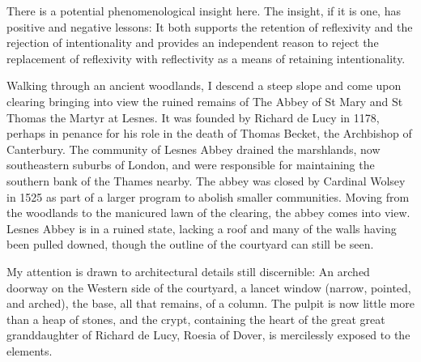 There is a potential phenomenological insight here. The insight, if it is one, has positive and negative lessons: It both supports the retention of reflexivity and the rejection of intentionality and provides an independent reason to reject the replacement of reflexivity with reflectivity as a means of retaining intentionality. 

Walking through an ancient woodlands, I descend a steep slope and come upon clearing bringing into view the ruined remains of The Abbey of St Mary and St Thomas the Martyr at Lesnes. It was founded by Richard de Lucy in 1178, perhaps in penance for his role in the death of Thomas Becket, the Archbishop of Canterbury. The community of Lesnes Abbey drained the marshlands, now southeastern suburbs of London, and were responsible for maintaining the southern bank of the Thames nearby. The abbey was closed by Cardinal Wolsey in 1525 as part of a larger program to abolish smaller communities. Moving from the woodlands to the manicured lawn of the clearing, the abbey comes into view. Lesnes Abbey is in a ruined state, lacking a roof and many of the walls having been pulled downed, though the outline of the courtyard can still be seen.

My attention is drawn to architectural details still discernible: An arched doorway on the Western side of the courtyard, a lancet window (narrow, pointed, and arched), the base, all that remains, of a column. The pulpit is now little more than a heap of stones, and the crypt, containing the heart of the great great granddaughter of Richard de Lucy, Roesia of Dover, is mercilessly exposed to the elements.

